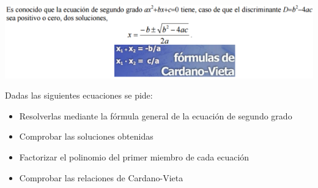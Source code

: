 \documentclass[spanish, 12pt]{exam}
\begin{document}
\includegraphics[width=0.9\columnwidth]{ec2grado}

\begin{questions}


\question Dadas las siguientes ecuaciones se pide:
\begin{itemize}
\item Resolverlas mediante la fórmula general de la ecuación de segundo grado
\item Comprobar las soluciones obtenidas
\item Factorizar el polinomio del primer miembro de cada ecuación
\item Comprobar las relaciones de Cardano-Vieta
\end{itemize}

\begin{multicols}{3}
\end{multicols}
\end{questions}
\end{document}
